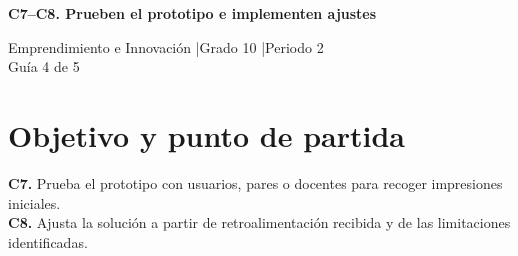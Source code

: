 \makeatletter
{}
\makeatother


\usepackage[spanish]{babel}
\usepackage{lmodern}
\usepackage{titlesec}
\geometry{a4paper,margin=1.6cm}
\linespread{1.10}

\hypersetup{allcolors=LinkColor}
\newcommand{\guidelink}[2]{\href{#1}{\textbf{\underline{#2}}}}
\newcommand{\instruction}[1]{\textcolor{InstructionColor}{\textbf{#1}}}
\newcommand{\concept}[1]{\textcolor{ConceptColor}{\textbf{#1}}}
\newcommand{\checkbox}{%
    \begingroup
    \setlength{\fboxrule}{0.4pt}%
    \setlength{\fboxsep}{2pt}%
    \fbox{\rule{0pt}{0.8ex}\rule{0.8ex}{0pt}}%
    \endgroup}

\setlength{\parskip}{4pt}
\setlength{\tabcolsep}{5pt}
\renewcommand{\arraystretch}{1.15}
\titleformat{\section}{\large\bfseries\color{HeadingColor}}{}{0pt}{}
\titlespacing*{\section}{0pt}{10pt}{3pt}




\begin{center}
{\Large\bfseries\color{HeadingColor} C7--C8. Prueben el prototipo e implementen ajustes\par}
\vspace{3pt}
Emprendimiento e Innovación \enspace|\enspace Grado 10 \enspace|\enspace Periodo 2\\
Guía 4 de 5
\end{center}

\section*{Objetivo y punto de partida}
\concept{C7.} Prueba el prototipo con usuarios, pares o docentes para recoger impresiones iniciales.\\
\concept{C8.} Ajusta la solución a partir de retroalimentación recibida y de las limitaciones identificadas.

